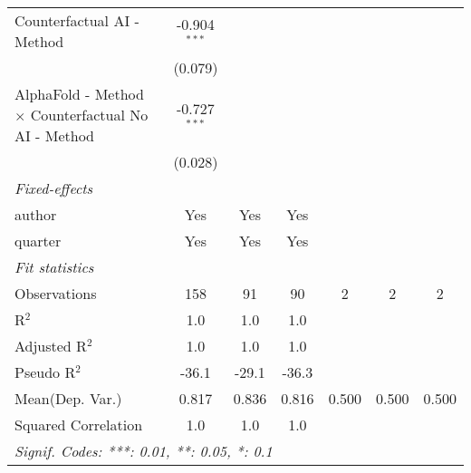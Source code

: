 \begin{tabular}{lcccccc}
   Counterfactual AI - Method                                 & -0.904$^{***}$ &                &                &     &     &   \\   
                                                              & (0.079)        &                &                &     &     &   \\   
   AlphaFold - Method $\times$ Counterfactual No AI - Method  & -0.727$^{***}$ &                &                &     &     &   \\   
                                                              & (0.028)        &                &                &     &     &   \\   
   \midrule
   \emph{Fixed-effects}\\
   author                                                     & Yes            & Yes            & Yes            &     &     & \\  
   quarter                                                    & Yes            & Yes            & Yes            &     &     & \\  
   \midrule
   \emph{Fit statistics}\\
   Observations                                               & 158            & 91             & 90             & 2   & 2   & 2\\  
   R$^2$                                                      & 1.0            & 1.0            & 1.0            &     &     & \\  
   Adjusted R$^2$                                             & 1.0            & 1.0            & 1.0            &     &     & \\  
   Pseudo R$^2$                                               & -36.1          & -29.1          & -36.3          &     &     & \\  
Mean(Dep. Var.) & 0.817 & 0.836 & 0.816 & 0.500 & 0.500 & 0.500 \\
   Squared Correlation                                        & 1.0            & 1.0            & 1.0            &     &     & \\  
   \midrule \midrule
   \multicolumn{7}{l}{\emph{Signif. Codes: ***: 0.01, **: 0.05, *: 0.1}}\\
\end{tabular}
\par\endgroup
